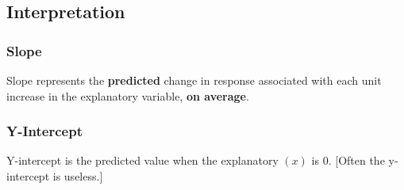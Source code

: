 \documentclass[10pt]{report}
\begin{document}
\subsection{Interpretation} %
\label{sub:interpretation}
\subsubsection{Slope}
Slope represents the  \textbf{predicted} change in response associated with each unit increase in the explanatory variable, \textbf{on average}.\\[.25in]
\subsubsection{Y-Intercept} 
Y-intercept is the predicted value when the explanatory $(x)$ is 0. [Often the y-intercept is useless.]
\end{document}
